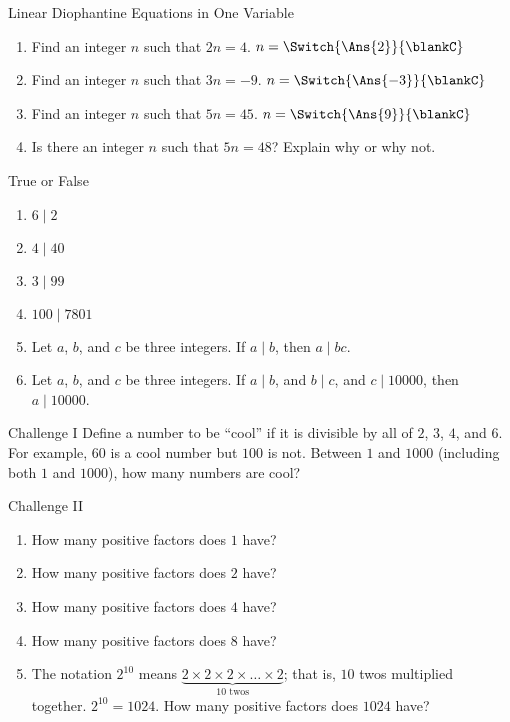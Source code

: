 \documentclass[12pt,letterpaper]{article}
\begin{document}
\begin{problem}{Linear Diophantine Equations in One Variable}
  \begin{enumerate}
    \item Find an integer \(n\) such that \(2n = 4\).
    \hfill \(n = \Switch{\Ans{2}}{\blankC}\)
    \item Find an integer \(n\) such that \(3n = -9\).
    \hfill \(n = \Switch{\Ans{-3}}{\blankC}\)
    \item Find an integer \(n\) such that \(5n = 45\).
    \hfill \(n = \Switch{\Ans{9}}{\blankC}\)
    \item Is there an integer \(n\) such that \(5n = 48\)? Explain why or why
    not. 
  \end{enumerate}
\end{problem}

\begin{problem}{True or False}
 \begin{enumerate}
  \item \(6 \mid 2\)      \hfill \TFFalse
  \item \(4 \mid 40\)     \hfill \TFTrue
  \item \(3 \mid 99\)     \hfill \TFTrue
  \item \(100 \mid 7801\) \hfill \TFFalse
  \item Let \(a\), \(b\), and \(c\) be three integers. If \(a \mid b\), then
  \(a \mid bc\).          \hfill \TFTrue
  \item Let \(a\), \(b\), and \(c\) be three integers. If \(a \mid b\), and \(b
  \mid c\), and \(c \mid 10000\), then \(a \mid 10000\).
                          \hfill \TFTrue
 \end{enumerate}
\end{problem}

\begin{problem}{Challenge I}
 Define a number to be ``cool'' if it is divisible by all of \(2\), \(3\),
 \(4\), and \(6\). For example, \(60\) is a cool number but \(100\) is not.
 Between \(1\) and \(1000\) (including both \(1\) and \(1000\)), how many
 numbers are cool? 
\end{problem}

\begin{problem}{Challenge II}
 \begin{enumerate}
  \item How many positive factors does \(1\) have? 
  \item How many positive factors does \(2\) have? 
  \item How many positive factors does \(4\) have? 
  \item How many positive factors does \(8\) have? 
  \item The notation \(2^{10}\) means \(\underbrace{ 2\times2\times2\times
  \ldots\times2}_{10\text{ twos}}\); that is, \(10\) twos multiplied together.
  \(2^{10}=1024\). How many positive factors does \(1024\) have?
 \end{enumerate}
\end{problem}
\end{document}
